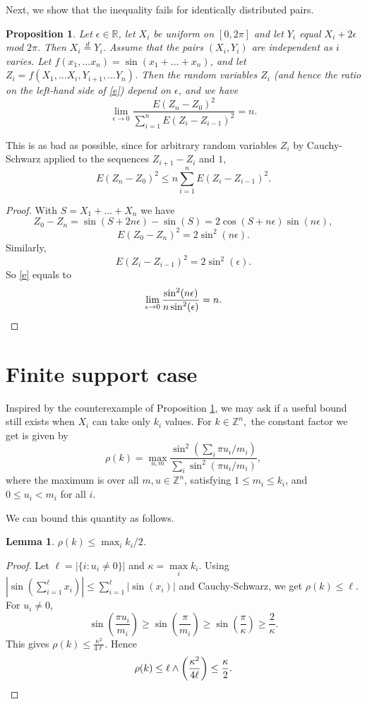 \documentclass[letterpaper, 12pt]{article}
\theoremstyle{plain}
\newtheorem{lemma}[theorem]{Lemma}
\newtheorem{proposition}[theorem]{Proposition}
\theoremstyle{definition}
\theoremstyle{remark}
\begin{document}
Next, we show that the inequality fails for identically distributed pairs.
\begin{proposition}\label{p:id}
Let \(\epsilon\in \mathbb R\), let \(X_i\) be uniform on \([0,2\pi]\) and let \(Y_i\) equal \(X_i+2\epsilon\) mod \(2\pi\). Then \(X_i\stackrel{d}{=}Y_i\). Assume that the pairs \((X_i,Y_i)\) are independent as \(i\) varies. Let \(f(x_1,\ldots x_n)=\sin(x_1+\ldots +x_n)\), and let \(Z_i=f(X_1,\ldots X_{i},Y_{i+1},\ldots Y_n)\). Then the random variables \(Z_i\) (and hence the ratio on the left-hand side of \eqref{e}) depend on \(\epsilon\), and we have
\begin{equation}\label{e}
\lim_{\epsilon\to 0} \frac
{E(Z_n-Z_0)^2}{\sum_{i=1}^n E(Z_i-Z_{i-1})^2}=n.
\end{equation}
\end{proposition}

This is as bad as possible, since for arbitrary random variables \(Z_i\) by Cauchy-Schwarz applied to the sequences \(Z_{i+1}-Z_i\) and \(1\),
\begin{equation}\label{e:CS}
E(Z_n-Z_0)^2\le n\sum_{i=1}^nE(Z_i-Z_{i-1})^2.
\end{equation}
\begin{proof}
With \(S=X_1+\ldots +X_n\) we have
$$
Z_0-Z_n=\sin(S+2n\epsilon)-\sin(S)=2\cos(S+n\epsilon)\sin(n\epsilon),
$$
$$
E(Z_0-Z_n)^2=2\sin^2(n\epsilon).
$$
Similarly,
$$
E(Z_i-Z_{i-1})^2=2\sin^2(\epsilon).
$$
So \eqref{e} equals to
\[
\lim_{\epsilon\to 0}\frac{\sin^2(n\epsilon)}{n\sin^2(\epsilon)}=n.
\qedhere\]
\end{proof}

\section*{Finite support case}

Inspired by the counterexample of Proposition \ref{p:id}, we may ask if a useful bound still exists when \(X_i\) can take only \(k_i\) values. For \(k\in\mathbb{Z}^n,\) the constant factor we get is given by
$$
\rho(k)=\max_{u,m}\frac{\sin^2(\sum_{i} \pi u_i/m_i)}{\sum_{i}\sin^2(\pi u_i/m_i)},
$$
where the maximum is over all \(m, u\in \mathbb Z^n\), satisfying \(1\le m_i\le k_i\), and \(0\le u_i<m_i\) for all \(i\).

We can bound this quantity as follows.
\begin{lemma}
    \(\rho(k)\le \max_i k_i/{2}\).
\end{lemma}
\begin{proof}
Let \(\ell=|\{i:u_i\neq 0\}|\) and \(\kappa=\max\limits_{i}k_i.\) Using \(\left\lvert\sin\left(\sum\limits_{i=1}^{\ell}x_i\right)\right\rvert\leq \sum\limits_{i=1}^\ell\left\lvert\sin(x_i)\right\rvert\) and Cauchy-Schwarz, we get \( \rho(k)\leq \ell\). For \(u_i\neq 0\),
\[
\sin\left(\frac{\pi u_i}{m_i}\right)\geq\sin\left(\frac{\pi }{m_i}\right)\geq \sin\left(\frac{\pi}{\kappa}\right)\geq \frac{2}{\kappa}.
\] 
This gives \(\rho(k)\leq \frac{\kappa^2}{4\ell}\). Hence
\[
\rho(k)\leq \ell\wedge \left(\frac{\kappa^2}{4\ell}\right)\leq \frac{\kappa}{2}.
\qedhere
\]
\end{proof}
\end{document}
